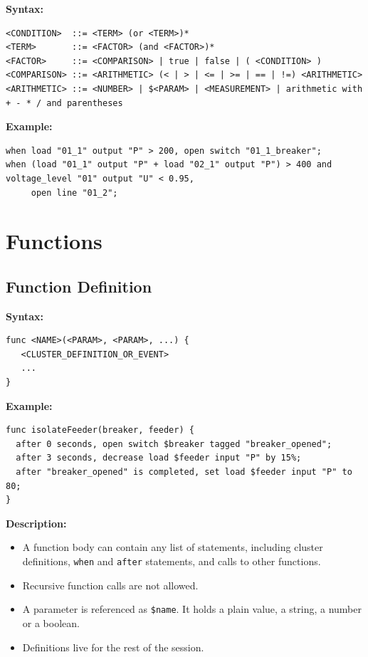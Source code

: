 \documentclass[12pt]{article}
\begin{document}
\textbf{Syntax:}
\begin{lstlisting}
<CONDITION>  ::= <TERM> (or <TERM>)*
<TERM>       ::= <FACTOR> (and <FACTOR>)*
<FACTOR>     ::= <COMPARISON> | true | false | ( <CONDITION> )
<COMPARISON> ::= <ARITHMETIC> (< | > | <= | >= | == | !=) <ARITHMETIC>
<ARITHMETIC> ::= <NUMBER> | $<PARAM> | <MEASUREMENT> | arithmetic with + - * / and parentheses
\end{lstlisting}

\textbf{Example:}
\begin{lstlisting}
when load "01_1" output "P" > 200, open switch "01_1_breaker";
when (load "01_1" output "P" + load "02_1" output "P") > 400 and voltage_level "01" output "U" < 0.95,
     open line "01_2";
\end{lstlisting}

\section{Functions}

\subsection{Function Definition}

\textbf{Syntax:}
\begin{lstlisting}
func <NAME>(<PARAM>, <PARAM>, ...) {
   <CLUSTER_DEFINITION_OR_EVENT>
   ...
}
\end{lstlisting}

\textbf{Example:}
\begin{lstlisting}
func isolateFeeder(breaker, feeder) {
  after 0 seconds, open switch $breaker tagged "breaker_opened";
  after 3 seconds, decrease load $feeder input "P" by 15%;
  after "breaker_opened" is completed, set load $feeder input "P" to 80;
}
\end{lstlisting}

\textbf{Description:}
\begin{itemize}
  \item A function body can contain any list of statements, including cluster definitions, \texttt{when} and \texttt{after} statements, and calls to other functions.
  \item Recursive function calls are not allowed.
  \item A parameter is referenced as \texttt{\$name}. It holds a plain value, a string, a number or a boolean.
  \item Definitions live for the rest of the session.
\end{itemize}
\end{document}
